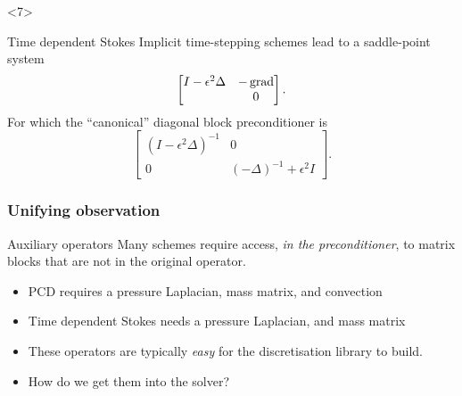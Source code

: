 \documentclass[presentation,aspectratio=43, 10pt]{beamer}
\DeclareMathOperator{\grad}{grad}
\let\div\relax
\DeclareMathOperator{\div}{div}
\begin{document}
\begin{frame}[t]
  \begin{onlyenv}<7>
    \begin{block}{Time dependent Stokes}
      Implicit time-stepping schemes lead to a saddle-point system
      \begin{equation*}
        \begin{bmatrix}
          I - \epsilon^2 \Delta & -\grad\\
          \div & 0
        \end{bmatrix}.
      \end{equation*}
      For which the ``canonical'' diagonal block preconditioner is
      \begin{equation*}
        \begin{bmatrix}
          (I - \epsilon^2 \Delta)^{-1} & 0\\
          0 & (-\Delta)^{-1} + \epsilon^2 I
        \end{bmatrix}.
      \end{equation*}
      \begin{flushright}
        \textcite{Mardal:2011} \hspace{4em}
      \end{flushright}
    \end{block}
  \end{onlyenv}
\end{frame}

\begin{frame}
  \frametitle{Unifying observation}
  \begin{block}{Auxiliary operators}
    Many schemes require access, \emph{in the preconditioner}, to
    matrix blocks that are not in the original operator.
  \end{block}
  \begin{example}
    \begin{itemize}
    \item PCD requires a pressure Laplacian, mass matrix, and
      convection
    \item Time dependent Stokes needs a pressure Laplacian, and mass
      matrix
    \end{itemize}
  \end{example}
  \begin{itemize}
  \item These operators are typically \emph{easy} for the
    discretisation library to build.
  \item How do we get them into the solver?
  \end{itemize}
\end{frame}
\end{document}
